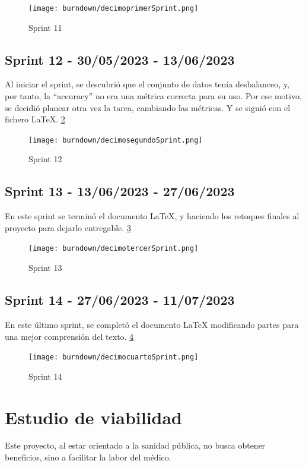 \begin{figure}[!ht]
         \centering
         \texttt{[image: burndown/decimoprimerSprint.png]}
         \caption{Sprint 11}
         \label{fig:Sprint11}
\end{figure}
\subsection{Sprint 12 - 30/05/2023 - 13/06/2023}

Al iniciar el sprint, se descubrió que el conjunto de datos tenía desbalanceo, y, por tanto, la ``accuracy'' no era una métrica correcta para su uso. Por ese motivo, se decidió planear otra vez la tarea, cambiando las métricas. Y se siguió con el fichero LaTeX.
\ref{fig:Sprint12}
\begin{figure}[!ht]
         \centering
         \texttt{[image: burndown/decimosegundoSprint.png]}
         \caption{Sprint 12}
         \label{fig:Sprint12}
\end{figure}

\subsection{Sprint 13 - 13/06/2023 - 27/06/2023}

En este sprint se terminó el documento LaTeX, y haciendo los retoques finales al proyecto para dejarlo entregable.
\ref{fig:Sprint13}
\begin{figure}[!ht]
         \centering
         \texttt{[image: burndown/decimotercerSprint.png]}
         \caption{Sprint 13}
         \label{fig:Sprint13}
\end{figure}
\subsection{Sprint 14 - 27/06/2023 - 11/07/2023}

En este último sprint, se completó el documento LaTeX modificando partes para una mejor comprensión del texto.
\ref{fig:Sprint14}
\begin{figure}[!ht]
         \centering
         \texttt{[image: burndown/decimocuartoSprint.png]}
         \caption{Sprint 14}
         \label{fig:Sprint14}
\end{figure}

\section{Estudio de viabilidad}
Este proyecto, al estar orientado a la sanidad pública, no busca obtener beneficios, sino a facilitar la labor del médico.

